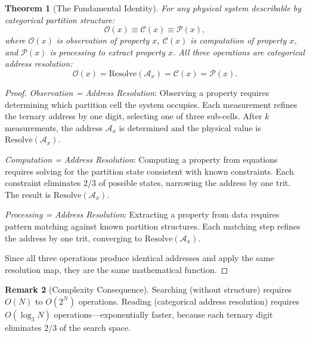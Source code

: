 \documentclass[twocolumn,10pt]{article}
\newtheorem{theorem}{Theorem}[section]
\theoremstyle{definition}
\newtheorem{remark}[theorem]{Remark}
\newcommand{\Obs}{\mathcal{O}}
\newcommand{\Comp}{\mathcal{C}}
\newcommand{\Proc}{\mathcal{P}}
\begin{document}
\begin{theorem}[The Fundamental Identity]\label{thm:fundamental_identity}
For any physical system describable by categorical partition structure:
\begin{equation}\label{eq:fundamental_identity}
    \boxed{\Obs(x) \equiv \Comp(x) \equiv \Proc(x),}
\end{equation}
where $\Obs(x)$ is observation of property $x$, $\Comp(x)$ is computation of property $x$, and $\Proc(x)$ is processing to extract property $x$. All three operations are categorical address resolution:
\begin{equation}\label{eq:all_resolve}
    \Obs(x) = \mathrm{Resolve}(\mathcal{A}_x) = \Comp(x) = \Proc(x).
\end{equation}
\end{theorem}

\begin{proof}
\emph{Observation = Address Resolution}: Observing a property requires determining which partition cell the system occupies. Each measurement refines the ternary address by one digit, selecting one of three sub-cells. After $k$ measurements, the address $\mathcal{A}_x$ is determined and the physical value is $\mathrm{Resolve}(\mathcal{A}_x)$.

\emph{Computation = Address Resolution}: Computing a property from equations requires solving for the partition state consistent with known constraints. Each constraint eliminates $2/3$ of possible states, narrowing the address by one trit. The result is $\mathrm{Resolve}(\mathcal{A}_x)$.

\emph{Processing = Address Resolution}: Extracting a property from data requires pattern matching against known partition structures. Each matching step refines the address by one trit, converging to $\mathrm{Resolve}(\mathcal{A}_x)$.

Since all three operations produce identical addresses and apply the same resolution map, they are the same mathematical function.
\end{proof}

\begin{remark}[Complexity Consequence]
Searching (without structure) requires $O(N)$ to $O(2^N)$ operations. Reading (categorical address resolution) requires $O(\log_3 N)$ operations---exponentially faster, because each ternary digit eliminates $2/3$ of the search space.
\end{remark}

\end{document}
